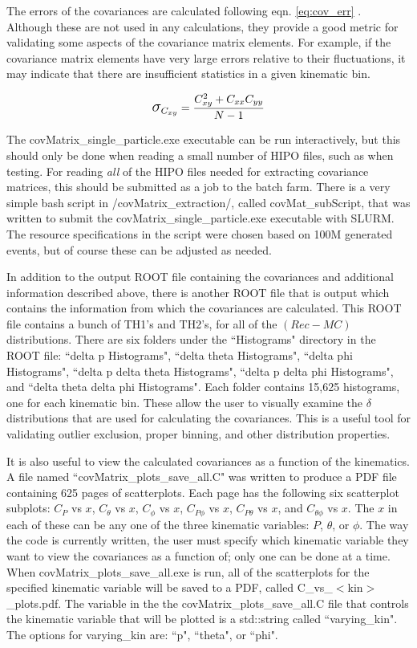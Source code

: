 \documentclass[showpacs,amsmath,amssymb,aps,prc,floatfix,showkeys,nofootinbib]{revtex4-1}
\begin{document}
The errors of the covariances are calculated following eqn. \ref{eq:cov_err} \cite{cov_err_stack_exchange}. Although these are not used in any calculations, they provide a good metric for validating some aspects of the covariance matrix elements. For example, if the covariance matrix elements have very large errors relative to their fluctuations, it may indicate that there are insufficient statistics in a given kinematic bin.

\begin{equation} \label{eq:cov_err}
\mathlarger{\mathlarger{\sigma}}_{C_{xy}}=\frac{C^2_{xy}+C_{xx}C_{yy}}{N-1}
\end{equation}

The covMatrix\_single\_particle.exe executable can be run interactively, but this should only be done when reading a small number of HIPO files, such as when testing. For reading \emph{all} of the HIPO files needed for extracting covariance matrices, this should be submitted as a job to the batch farm. There is a very simple bash script in /covMatrix\_extraction/, called covMat\_subScript, that was written to submit the covMatrix\_single\_particle.exe executable with SLURM. The resource specifications in the script were chosen based on 100M generated events, but of course these can be adjusted as needed. 

In addition to the output ROOT file containing the covariances and additional information described above, there is another ROOT file that is output which contains the information from which the covariances are calculated. This ROOT file contains a bunch of TH1's and TH2's, for all of the $(Rec-MC)$ distributions. There are six folders under the ``Histograms" directory in the ROOT file: ``delta p Histograms", ``delta theta Histograms", ``delta phi Histograms", ``delta p delta theta Histograms", ``delta p delta phi Histograms", and ``delta theta delta phi Histograms". Each folder contains 15,625 histograms, one for each kinematic bin. These allow the user to visually examine the $\delta$ distributions that are used for calculating the covariances. This is a useful tool for validating outlier exclusion, proper binning, and other distribution properties.

It is also useful to view the calculated covariances as a function of the kinematics. A file named ``covMatrix\_plots\_save\_all.C" was written to produce a PDF file containing 625 pages of scatterplots. Each page has the following six scatterplot subplots: $C_P$ vs $x$, $C_\theta$ vs $x$, $C_\phi$ vs $x$, $C_{P\phi}$ vs $x$, $C_{P\theta}$ vs $x$, and $C_{\theta\phi}$ vs $x$. The $x$ in each of these can be any one of the three kinematic variables: $P$, $\theta$, or $\phi$. The way the code is currently written, the user must specify which kinematic variable they want to view the covariances as a function of; only one can be done at a time. When covMatrix\_plots\_save\_all.exe is run, all of the scatterplots for the specified kinematic variable will be saved to a PDF, called C\_vs\_$<$kin$>$\_plots.pdf. The variable in the the covMatrix\_plots\_save\_all.C file that controls the kinematic variable that will be plotted is a std::string called ``varying\_kin". The options for varying\_kin are: ``p", ``theta", or ``phi".
\end{document}

